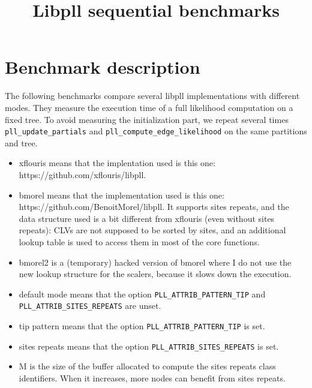\documentclass[a4paper]{article}
\begin{document}
\newcommand*{\figuretitle}[1]{%
    {\centering%
    \textbf{#1}%
    \par\medskip}%
}


\title{Libpll sequential benchmarks}
\maketitle


\section{Benchmark description}

The following benchmarks compare several libpll implementations with different modes. They measure the execution time of a full likelihood computation on a fixed tree. To avoid measuring the initialization part, we repeat several times  \texttt{pll\_update\_partials} and \texttt{pll\_compute\_edge\_likelihood} on the same partitions and tree.

\begin{itemize}
\item xflouris means that the implentation used is this one: \\ https://github.com/xflouris/libpll.
\item bmorel means that the implementation  used is this one: \\ https://github.com/BenoitMorel/libpll. It supports sites repeats, and the data structure used is a bit different from xflouris (even without sites repeats): CLVs are not supposed to be sorted by sites, and an additional lookup table is used to access them in most of the core functions.
\item bmorel2 is a (temporary) hacked version of bmorel where I do not use the new lookup structure for the scalers, because it slows down the execution.
\item default mode means that the option \texttt{PLL\_ATTRIB\_PATTERN\_TIP} and \texttt{PLL\_ATTRIB\_SITES\_REPEATS} are unset.
\item tip pattern means that the option \texttt{PLL\_ATTRIB\_PATTERN\_TIP} is set.
\item sites repeats means that the option \texttt{PLL\_ATTRIB\_SITES\_REPEATS} is set.
\item M is the size of the buffer allocated to compute the sites repeats class identifiers. When it increases, more nodes can benefit from sites repeats. 
\end{itemize}
\end{document}
